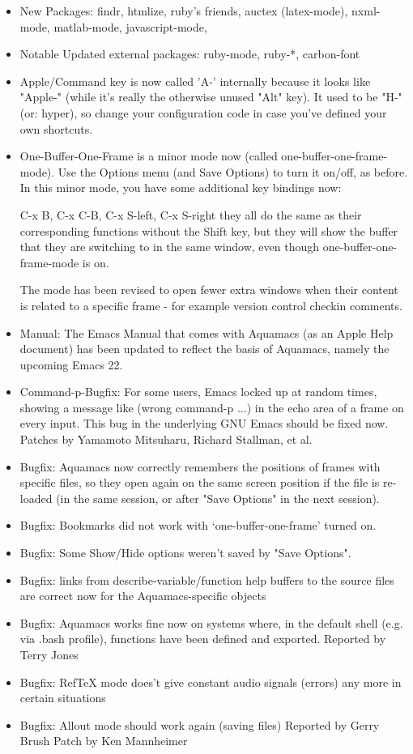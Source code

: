 \begin{itemize}
\item New Packages: findr, htmlize, ruby's friends, auctex
 	(latex-mode), nxml-mode, matlab-mode, javascript-mode, 
	
\item Notable Updated external packages: ruby-mode, ruby-*, carbon-font

\item Apple/Command key is now called 'A-' internally because it looks
	like "Apple-" (while it's really the otherwise unused "Alt" key). 
	It used to be "H-" (or: hyper), so change your configuration code
	in case you've defined your own shortcuts.

\item One-Buffer-One-Frame is a minor mode now (called
	one-buffer-one-frame-mode). Use the Options menu (and Save
	Options) to turn it on/off, as before.
	In this minor mode, you have some additional key bindings now:

	C-x B, C-x C-B, C-x S-left, C-x S-right
	they all do the same as their corresponding functions without the
	Shift key, but they will show the buffer that they are switching
	to in the same window, even though one-buffer-one-frame-mode is on.

	The mode has been revised to open fewer extra windows when their
	content is related to a specific frame - for example version
	control checkin comments.
	
\item Manual: The Emacs Manual that comes with Aquamacs (as an Apple
	Help document) has been updated to reflect the basis of Aquamacs,
	namely the upcoming Emacs 22.

\item Command-p-Bugfix: For some users, Emacs locked up at random
	times, showing a message like (wrong command-p ...) in the echo
	area of a frame on every input. This bug in the underlying GNU
	Emacs should be fixed now.
	Patches by Yamamoto Mitsuharu, Richard Stallman, et al.
	
\item Bugfix: Aquamacs now correctly remembers the positions of frames
	with specific files, so they open again on the same screen
	position if the file is re-loaded (in the same session, or after
	"Save Options" in the next session).
\item Bugfix: Bookmarks did not work with `one-buffer-one-frame'
	turned on.  
\item Bugfix: Some Show/Hide options weren't saved by
	"Save Options".
\item Bugfix: links from describe-variable/function help buffers to the 
	source files are correct now for the Aquamacs-specific objects
\item Bugfix: Aquamacs works fine now on systems where, in the default
	shell (e.g. via .bash profile), functions have been defined and
	exported.
	Reported by Terry Jones 
\item Bugfix: RefTeX mode does't give constant audio signals (errors) 
	any more in certain situations
\item Bugfix: Allout mode should work again (saving files)
	Reported by Gerry Brush
	Patch by Ken Mannheimer



\end{itemize}
